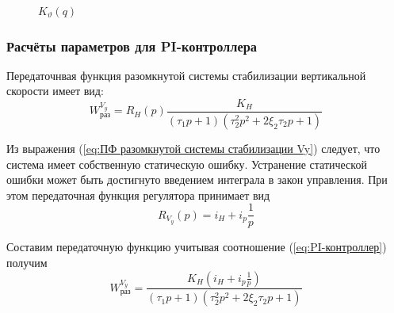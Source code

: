     \begin{figure}[H]
        \caption{$K_{\vartheta}(q) $}
        \label{fig:K_wz}
    \end{figure}
    
    \subsubsection{Расчёты параметров для PI-контроллера}
    
    Передаточнвая функция разомкнутой системы стабилизации вертикальной скорости имеет вид:
    \begin{equation}
    \label{eq:ПФ разомкнутой системы стабилизации Vy}
        W^{V_y}_\text{раз}=R_H(p)\frac{K_H}{(\tau_1p+1)(\tau_2^2p^2+2\xi_2\tau_2p+1)}
    \end{equation}
    
    Из выражения (\ref{eq:ПФ разомкнутой системы стабилизации Vy}) следует, что система имеет собственную статическую ошибку. Устранение статической ошибки может быть достигнуто введением интеграла в закон управления. При этом передаточная функция регулятора принимает вид
    \begin{equation}
        \label{eq:PI-контроллер}
        R_{V_y}(p) = i_H + i_p\frac{1}{p}
    \end{equation}
    
    
    Составим передаточную функцию учитывая соотношение (\ref{eq:PI-контроллер}) получим
    \begin{equation}
        \label{eq:ПФ с PI}
        W_\text{раз}^{V_{y}} = \frac{K_H (i_H+i_p\frac{1}{p})}{(\tau_1p+1)(\tau_2^2p^2+2\xi_2\tau_2p+1)}
    \end{equation}
    
